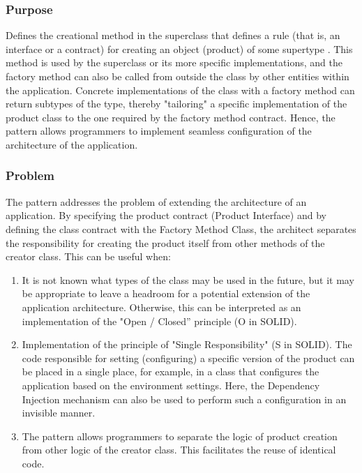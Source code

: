 \documentclass[12pt]{book}
\begin{document}
{{\subsubsection{Purpose}
Defines the creational method in the  superclass that defines a rule (that is, an interface or a contract) for creating an object (product) of some supertype . This method is used by the superclass or its more specific implementations, and the factory method can also be called from outside the class by other entities within the application. Concrete implementations of the  class with a factory method can return subtypes of the  type, thereby "tailoring" a specific implementation of the product class to the one required by the factory method contract. Hence, the pattern allows programmers to implement seamless configuration of the architecture of the application.

\subsubsection{Problem}
The pattern addresses the problem of extending the architecture of an application. By specifying  the product contract (Product Interface) and by defining the class contract with the Factory Method Class, the architect separates the responsibility for creating the product itself from other methods of the creator class. This can be useful when:
\begin{enumerate}
    \item It is not known what types of the  class may be used in the future, but it may be appropriate to leave a headroom for a potential extension of the application architecture. Otherwise, this can be interpreted as an implementation of the "Open / Closed” principle (O in SOLID).
    \item Implementation of the principle of "Single Responsibility" (S in SOLID). The code responsible for setting (configuring) a specific version of the product can be placed in a single place, for example, in a class that configures the application based on the environment settings. Here, the Dependency Injection mechanism can also be used to perform such a configuration in an invisible manner.
    \item The pattern allows programmers to separate the logic of product creation from other logic of the creator class. This facilitates the reuse of identical code.
\end{enumerate}

}}
\end{document}
